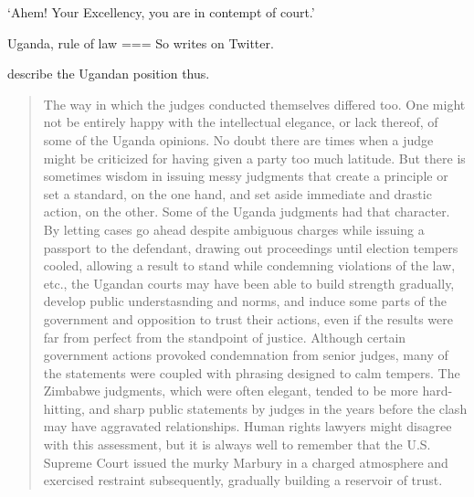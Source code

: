 ‘Ahem! Your Excellency, you are in contempt of court.’

Uganda, rule of law
===
So writes \textcite{ssemekadde2024} on Twitter.

\textcite[258]{widner2008} describe the Ugandan position thus.
\begin{quote}
     The way in which the judges conducted themselves differed too. One might not be entirely happy with the intellectual elegance, or lack thereof, of some of the Uganda opinions. No doubt there are times when a judge might be criticized for having given a party too much latitude. But there is sometimes wisdom in issuing messy judgments that create a principle or set a standard, on the one hand, and set aside immediate and drastic action, on the other. Some of the Uganda judgments had that character. By letting cases go ahead despite ambiguous charges while issuing a passport to the defendant, drawing out proceedings until election tempers cooled, allowing a result to stand while condemning violations of the law, etc., the Ugandan courts may have been able to build strength gradually, develop public understasnding and norms, and induce some parts of the government and opposition to trust their actions, even if the results were far from perfect from the standpoint of justice. Although certain government actions provoked condemnation from senior judges, many of the statements were coupled with phrasing designed to calm tempers. The Zimbabwe judgments, which were often elegant, tended to be more hard-hitting, and sharp public statements by judges in the years before the clash may have aggravated relationships. Human rights lawyers might disagree with this assessment, but it is always well to remember that the U.S. Supreme Court issued the murky Marbury in a charged atmosphere and exercised restraint subsequently, gradually building a reservoir of trust.
\end{quote}

